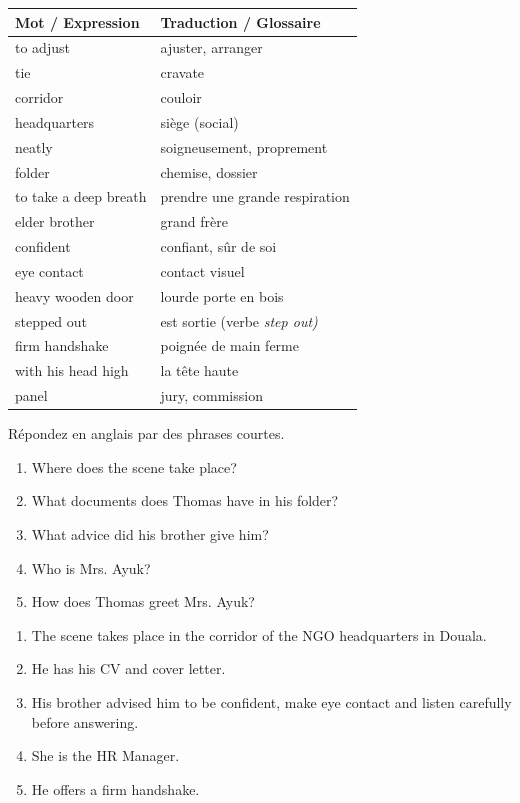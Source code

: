 \documentclass[11pt]{article}
\newcommand{\eng}[1]{\ifmmode\text{\textit{#1}}\else\begingroup\selectlanguage{english}\itshape #1\endgroup\fi}
\begin{document}
\begin{center}
\begin{tabularx}{\linewidth}{|l|X|}
\hline
\rowcolor{popblueL} \textbf{Mot / Expression} & \textbf{Traduction / Glossaire} \\ \hline
to adjust & ajuster, arranger \\ \hline
tie & cravate \\ \hline
corridor & couloir \\ \hline
headquarters & siège (social) \\ \hline
neatly & soigneusement, proprement \\ \hline
folder & chemise, dossier \\ \hline
to take a deep breath & prendre une grande respiration \\ \hline
elder brother & grand frère \\ \hline
confident & confiant, sûr de soi \\ \hline
eye contact & contact visuel \\ \hline
heavy wooden door & lourde porte en bois \\ \hline
stepped out & est sortie (verbe \eng{step out}) \\ \hline
firm handshake & poignée de main ferme \\ \hline
with his head high & la tête haute \\ \hline
panel & jury, commission \\ \hline
\end{tabularx}
\end{center}

\begin{exercice}
Répondez en anglais par des phrases courtes.
\begin{enumerate}
\item Where does the scene take place?
\item What documents does Thomas have in his folder?
\item What advice did his brother give him?
\item Who is Mrs. Ayuk?
\item How does Thomas greet Mrs. Ayuk?
\end{enumerate}
\end{exercice}

\begin{corrige}[Exercice n°1]
\begin{enumerate}
\item The scene takes place in the corridor of the NGO headquarters in Douala.
\item He has his CV and cover letter.
\item His brother advised him to be confident, make eye contact and listen carefully before answering.
\item She is the HR Manager.
\item He offers a firm handshake.
\end{enumerate}
\end{corrige}
\end{document}
